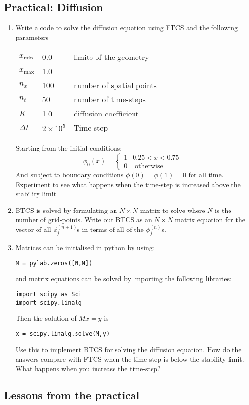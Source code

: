 \subsection{Practical: Diffusion}

\begin{enumerate}
\item Write a code to solve the diffusion equation using FTCS and the following parameters

\begin{tabular}{lll}
$x_{\min}$ & 0.0 & limits of the geometry\\
$x_{\max}$ & 1.0 & \\
$n_x$ & 100 & number of spatial points \\
$n_t$ & 50 & number of time-steps \\
$K$ & 1.0 & diffusion coefficient \\
$\Delta t$ & $2\times 10^5$ & Time step \\
\end{tabular}

Starting from the initial conditions:
\begin{equation*}
\phi_0(x) = \begin{cases}
1 & 0.25<x<0.75 \\
0 & \text{ otherwise}
\end{cases}
\end{equation*}
And subject to boundary conditions $\phi(0)=\phi(1)=0$ for all time. Experiment to see what happens when the time-step is increased above the stability limit.

\item BTCS is solved by formulating an $N\times N$ matrix to solve where $N$ is the number of grid-points. Write out BTCS as an $N\times N$ matrix equation for the vector of all $\phi_j^{(n+1)}$s in terms of all of the $\phi_j^{(n)}$s. 

\item Matrices can be initialised in python by using:
\begin{lstlisting}
M = pylab.zeros([N,N])
\end{lstlisting}
and matrix equations can be solved by importing the following libraries:
\begin{lstlisting}
import scipy as Sci
import scipy.linalg
\end{lstlisting}
Then the solution of $Mx=y$ is
\begin{lstlisting}
x = scipy.linalg.solve(M,y)
\end{lstlisting}
Use this to implement BTCS for solving the diffusion equation. How do the answers compare with FTCS when the time-step is below the stability limit. What happens when you increase the time-step?

\end{enumerate}

\subsection{Lessons from the practical}


